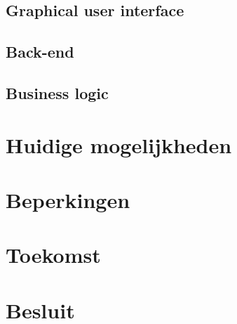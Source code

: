 \subsection{Graphical user interface}
\subsection{Back-end}
\subsection{Business logic}
\section{Huidige mogelijkheden}
\section{Beperkingen}
\section{Toekomst}
\section{Besluit}

